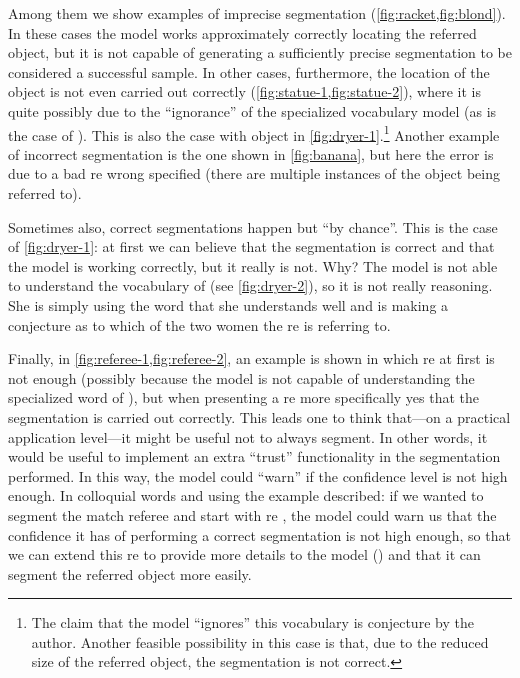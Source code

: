 Among them we show examples of imprecise segmentation
(\vref{fig:racket,fig:blond}). In these cases the model works approximately
correctly locating the referred object, but it is not capable of generating a
sufficiently precise segmentation to be considered a successful sample. In
other cases, furthermore, the location of the object is not even carried out
correctly (\vref{fig:statue-1,fig:statue-2}), where it is quite possibly due to
the ``ignorance'' of the specialized vocabulary model (as is the case of
). This is also the case with object  in
\vref{fig:dryer-1}.\footnote{The claim that the model ``ignores'' this
  vocabulary is conjecture by the author. Another feasible possibility in this
  case is that, due to the reduced size of the referred object, the
  segmentation is not correct.} Another example of incorrect segmentation is
the one shown in \vref{fig:banana}, but here the error is due to a bad \gls{re}
wrong specified (there are multiple instances of the object being referred to).

Sometimes also, correct segmentations happen but ``by chance''. This is the
case of \vref{fig:dryer-1}: at first we can believe that the segmentation is
correct and that the model is working correctly, but it really is not. Why? The
model is not able to understand the vocabulary of  (see
\vref{fig:dryer-2}), so it is not really reasoning. She is simply using the
word  that she understands well and is making a conjecture as to
which of the two women the \gls{re} is referring to.

Finally, in \vref{fig:referee-1,fig:referee-2}, an example is shown in which
\gls{re} at first is not enough (possibly because the model is not capable of
understanding the specialized word of ), but when presenting a
\gls{re} more specifically yes that the segmentation is carried out
correctly. This leads one to think that---on a practical application level---it
might be useful not to always segment. In other words, it would be useful to
implement an extra ``trust'' functionality in the segmentation performed. In
this way, the model could ``warn'' if the confidence level is not high
enough. In colloquial words and using the example described: if we wanted to
segment the match referee and start with \gls{re} ,
the model could warn us that the confidence it has of performing a correct
segmentation is not high enough, so that we can extend this \gls{re} to provide
more details to the model () and that
it can segment the referred object more easily.
